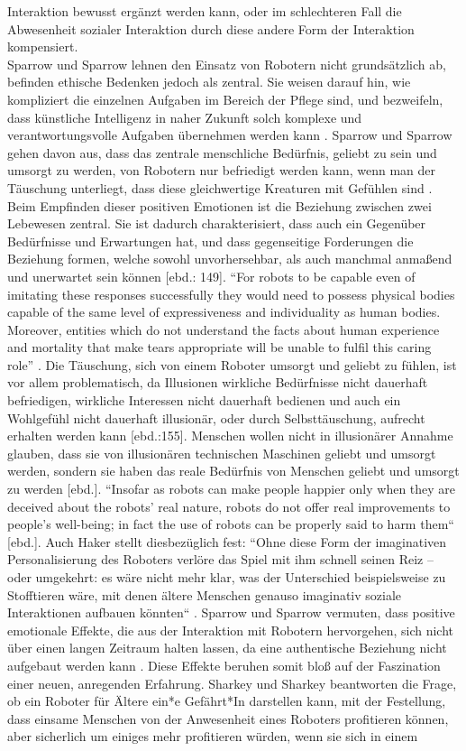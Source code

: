 Interaktion bewusst ergänzt werden kann, oder im schlechteren Fall die Abwesenheit sozialer Interaktion durch diese andere Form der Interaktion kompensiert.\\Sparrow und Sparrow lehnen den Einsatz von Robotern nicht grundsätzlich ab, befinden ethische Bedenken jedoch als zentral. Sie weisen darauf hin, wie kompliziert die einzelnen Aufgaben im Bereich der Pflege sind, und bezweifeln, dass künstliche Intelligenz in naher Zukunft solch komplexe und verantwortungsvolle Aufgaben übernehmen werden kann \cite[S.145 ff]{sparrow}. Sparrow und Sparrow gehen davon aus, dass das zentrale menschliche Bedürfnis, geliebt zu sein und umsorgt zu werden, von Robotern nur befriedigt werden kann, wenn man der Täuschung unterliegt, dass diese gleichwertige Kreaturen mit Gefühlen sind \cite[S. 154 ff]{sparrow}. Beim Empfinden dieser positiven Emotionen ist die Beziehung zwischen zwei Lebewesen zentral. Sie ist dadurch charakterisiert, dass auch ein Gegenüber Bedürfnisse und Erwartungen hat, und dass gegenseitige Forderungen die Beziehung formen, welche sowohl unvorhersehbar, als auch manchmal anmaßend und unerwartet sein können [ebd.: 149]. “For robots to be capable even of imitating these responses successfully they would need to possess physical bodies capable of the same level of expressiveness and individuality as human bodies. Moreover, entities which do not understand the facts about human experience and mortality that make tears appropriate will be unable to fulfil this caring role” \cite[S. 154]{sparrow}. Die Täuschung, sich von einem Roboter umsorgt und geliebt zu fühlen, ist vor allem problematisch, da Illusionen wirkliche Bedürfnisse nicht dauerhaft befriedigen, wirkliche Interessen nicht dauerhaft bedienen und auch ein Wohlgefühl nicht dauerhaft illusionär, oder durch Selbsttäuschung, aufrecht erhalten werden kann [ebd.:155]. Menschen wollen nicht in illusionärer Annahme glauben, dass sie von illusionären technischen Maschinen geliebt und umsorgt werden, sondern sie haben das reale Bedürfnis von Menschen geliebt und umsorgt zu werden [ebd.]. “Insofar as robots can make people happier only when they are deceived about the robots’ real nature, robots do not offer real improvements to people’s well-being; in fact the use of robots can be properly said to harm them“ [ebd.].  Auch Haker stellt diesbezüglich fest: “Ohne diese Form der imaginativen Personalisierung des Roboters verlöre das Spiel mit ihm schnell seinen Reiz – oder umgekehrt: es wäre nicht mehr klar, was der Unterschied beispielsweise zu Stofftieren wäre, mit denen ältere Menschen genauso imaginativ soziale Interaktionen aufbauen könnten“ \cite[S. 59]{haker}. Sparrow und Sparrow vermuten, dass positive emotionale Effekte, die aus der Interaktion mit Robotern hervorgehen, sich nicht über einen langen Zeitraum halten lassen, da eine authentische Beziehung nicht aufgebaut werden kann \cite[S. 149]{sparrow}. Diese Effekte beruhen somit bloß auf der Faszination einer neuen, anregenden Erfahrung. Sharkey und Sharkey beantworten die Frage, ob ein Roboter für Ältere ein*e Gefährt*In darstellen kann, mit der Festellung, dass einsame Menschen von der Anwesenheit eines Roboters profitieren können, aber sicherlich um einiges mehr profitieren würden, wenn sie sich in einem 